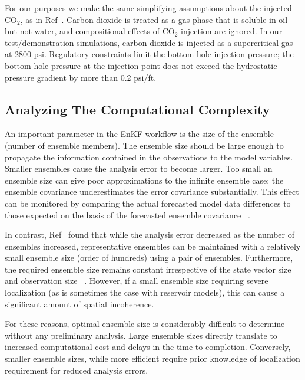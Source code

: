 \documentclass{rspublic}
\newcommand{\up}{\vspace*{-0.3em}}
\begin{document}
For our purposes we make the same simplifying assumptions about the
injected CO$_2$, as in Ref~\cite{Pawar}. Carbon dioxide is treated as
a gas phase that is soluble in oil but not water, and compositional
effects of CO$_2$ injection are ignored. In our test/demonstration
simulations, carbon dioxide is injected as a supercritical gas at 2800
psi. Regulatory constraints limit the bottom-hole injection pressure;
the bottom hole pressure at the injection point does not exceed the
hydrostatic pressure gradient by more than 0.2 psi/ft.
\up\up\up\up\up\up
\subsection{Analyzing The Computational Complexity}



An important parameter in the EnKF workflow is the size of the
ensemble (number of ensemble members). The ensemble size should be
large enough to propagate the information contained in the
observations to the model variables. Smaller ensembles cause the
analysis error to become larger. Too small an ensemble size can give
poor approximations to the infinite ensemble case: the ensemble
covariance underestimates the error covariance substantially. This
effect can be monitored by comparing the actual forecasted model data
differences to those expected on the basis of the forecasted ensemble
covariance ~\cite{Burger98}.

In contrast, Ref~\cite{Hout98} found that while the analysis error
decreased as the number of ensembles increased, representative
ensembles can be maintained with a relatively small ensemble size
(order of hundreds) using a pair of ensembles. Furthermore, the
required ensemble size remains constant irrespective of the state
vector size and observation size ~\cite{Mitchell02}. However, if a
small ensemble size requiring severe localization (as is sometimes the
case with reservoir models), this can cause a significant amount of
spatial incoherence.


For these reasons, optimal ensemble size is considerably difficult to
determine without any preliminary analysis. Large ensemble sizes
directly translate to increased computational cost and delays in the
time to completion. Conversely, smaller ensemble sizes, while more
efficient require prior knowledge of localization requirement for
reduced analysis errors.
\up\up\up\up
\end{document}

